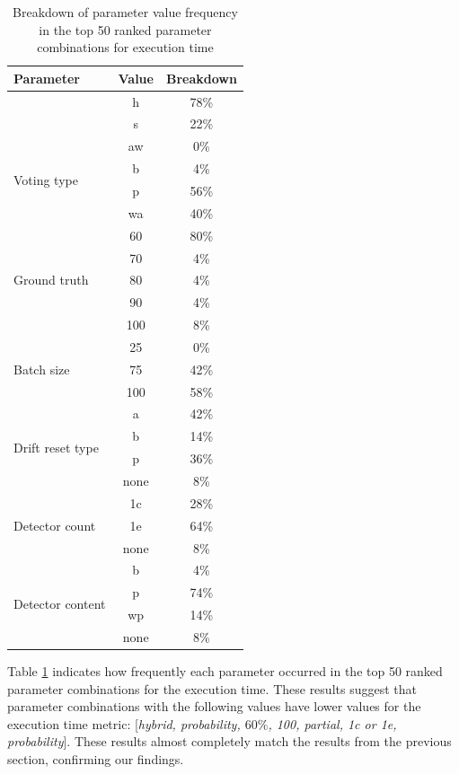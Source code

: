 \begin{table}[]
\centering
\caption{\label{table:rank_seconds_breakdown}Breakdown of parameter value frequency in the top 50 ranked parameter combinations for execution time}
\begin{tabular}{|l|c|c|}
\hline
\textbf{Parameter} & \textbf{Value} & \textbf{Breakdown} \\ \hline \hhline{===}
\multirow{2}{*}{Sliding type} & h & 78\% \\ \cline{2-3} 
 & s & 22\% \\ \hline
\multirow{4}{*}{Voting type} & aw & 0\% \\ \cline{2-3} 
 & b & 4\% \\ \cline{2-3} 
 & p & 56\% \\ \cline{2-3} 
 & wa & 40\% \\ \hline
\multirow{5}{*}{Ground truth} & 60 & 80\% \\ \cline{2-3} 
 & 70 & 4\% \\ \cline{2-3} 
 & 80 & 4\% \\ \cline{2-3} 
 & 90 & 4\% \\ \cline{2-3} 
 & 100 & 8\% \\ \hline
\multirow{3}{*}{Batch size} & 25 & 0\% \\ \cline{2-3} 
 & 75 & 42\% \\ \cline{2-3} 
 & 100 & 58\% \\ \hline
\multirow{4}{*}{Drift reset type} & a & 42\% \\ \cline{2-3} 
 & b & 14\% \\ \cline{2-3} 
 & p & 36\% \\ \cline{2-3} 
 & none & 8\% \\ \hline
\multirow{3}{*}{Detector count} & 1c & 28\% \\ \cline{2-3} 
 & 1e & 64\% \\ \cline{2-3} 
 & none & 8\% \\ \hline
\multicolumn{1}{|c|}{\multirow{4}{*}{Detector content}} & b & 4\% \\ \cline{2-3} 
\multicolumn{1}{|c|}{} & p & 74\% \\ \cline{2-3} 
\multicolumn{1}{|c|}{} & wp & 14\% \\ \cline{2-3} 
\multicolumn{1}{|c|}{} & none & 8\% \\ \hline
\end{tabular}
\end{table}

Table \ref{table:rank_seconds_breakdown} indicates how frequently each parameter occurred in the top 50 ranked parameter combinations for the execution time. These results suggest that parameter combinations with the following values have lower values for the execution time metric: [\textit{hybrid, probability, $60\%$, 100, partial, 1c or 1e, probability}]. These results almost completely match the results from the previous section, confirming our findings.

